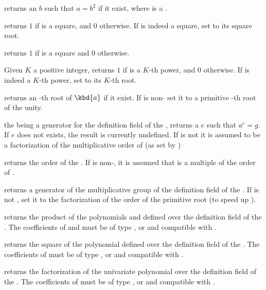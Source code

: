  returns an  $b$ such that $a=b^2$ if
it exist, where  is a .

 returns $1$ if  is a
square, and $0$ otherwise. If  is indeed a square, set  to its
square root.

 returns $1$ if  is a square and $0$
otherwise.

 Given $K$ a positive integer,
returns $1$ if  is a $K$-th power, and $0$ otherwise. If  is
indeed a $K$-th power, set  to its $K$-th root.

 returns an -th root of
$\kbd{a}$ if it exist. If  is non- set it to a primitive
-th root of the unity.

 the   being a
generator for the definition field of the  , returns a
 $e$ such that $a^e=g$.  If $e$ does not exists, the result is
currently undefined. If  is not  it is assumed to be a
factorization of the multiplicative order of  (as set by
)

 returns the order of the  .
If  is non-, it is assumed that  is a multiple of the
order of .

 returns a generator of the
multiplicative group of the definition field of the  .
If  is not , set it to the factorization of the order
of the primitive root (to speed up ).

 returns the product of the polynomials
 and  defined over the definition field of the 
. The coefficients of  and  must be of type ,
 or  and compatible with .

 returns the square of the polynomial
 defined over the definition field of the 
. The coefficients of  must be of type ,
 or  and compatible with .

 returns the factorization of the univariate
polynomial  over the definition field of the  . The
coefficients of  must be of type ,  or 
and compatible with .

